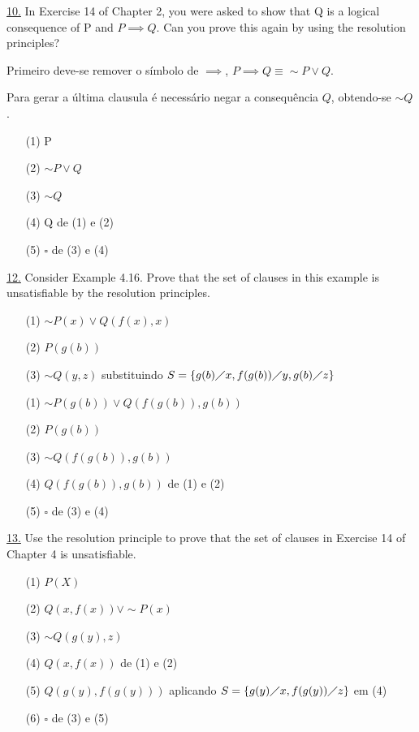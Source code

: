 \underline{10.} In Exercise 14 of Chapter 2, you were asked to show that Q is a logical consequence of P and $ P \implies Q $. Can you prove this again by using the resolution principles?

Primeiro deve-se remover o símbolo de $\implies$, $ P \implies Q \equiv \sim P \vee Q $.

Para gerar a última clausula é necessário negar a consequência $ Q $, obtendo-se $ \sim Q $.

\begin{itemize}
 \item[(1)] P
 \item[(2)] $ \sim P \vee Q $
 \item[(3)] $ \sim Q $
 \item[(4)] Q de (1) e (2)
 \item[(5)] $ \square $ de (3) e (4)
\end{itemize}

\underline{12.} Consider Example 4.16. Prove that the set of clauses in this example is unsatisfiable by the resolution principles.

\begin{itemize}
 \item[(1)] $ \sim P(x) \vee Q(f(x),x) $
 \item[(2)] $ P(g(b)) $
 \item[(3)] $ \sim Q(y,z) $ \newline
substituindo $ S = \{ g(b) \diagup x, f(g(b)) \diagup y, g(b) \diagup z \} $
 \item[(1)] $ \sim P(g(b)) \vee Q(f(g(b)),g(b)) $
 \item[(2)] $ P(g(b)) $
 \item[(3)] $ \sim Q(f(g(b)),g(b)) $
 \item[(4)] $ Q(f(g(b)),g(b)) $ de (1) e (2)
 \item[(5)] $ \square $ de (3) e (4)
\end{itemize}

\underline{13.} Use the resolution principle to prove that the set of clauses in Exercise 14 of Chapter 4 is unsatisfiable.

\begin{itemize}
 \item[(1)] $ P(X) $
 \item[(2)] $ Q(x,f(x)) \vee \sim P(x) $
 \item[(3)] $ \sim Q(g(y),z) $
 \item[(4)] $ Q(x, f(x)) $ de (1) e (2)
 \item[(5)] $ Q(g(y), f(g(y))) $ aplicando $S=\{g(y)\diagup x , f(g(y)) \diagup z \} $ em (4)
 \item[(6)] $ \square $ de (3) e (5)
\end{itemize}


